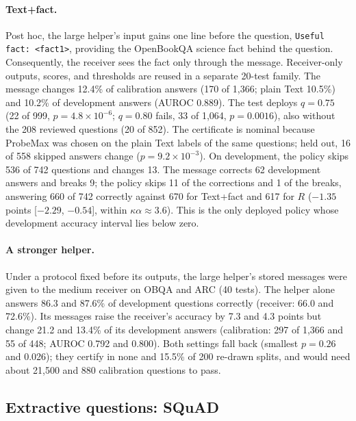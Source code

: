 \paragraph{Text+fact.} Post hoc, the large helper's input gains one line before the question, \texttt{Useful fact: <fact1>}, providing the OpenBookQA science fact behind the question. Consequently, the receiver sees the fact only through the message. Receiver-only outputs, scores, and thresholds are reused in a separate 20-test family. The message changes 12.4\% of calibration answers (170 of 1,366; plain Text 10.5\%) and 10.2\% of development answers (AUROC 0.889). The test deploys $q=0.75$ (22 of 999, $p=4.8\times10^{-6}$; $q=0.80$ fails, 33 of 1,064, $p=0.0016$), also without the 208 reviewed questions (20 of 852). The certificate is nominal because ProbeMax was chosen on the plain Text labels of the same questions; held out, 16 of 558 skipped answers change ($p=9.2\times10^{-3}$). On development, the policy skips 536 of 742 questions and changes 13. The message corrects 62 development answers and breaks 9; the policy skips 11 of the corrections and 1 of the breaks, answering 660 of 742 correctly against 670 for Text+fact and 617 for $R$ ($-1.35$ points [$-2.29$, $-0.54$], within $\kappa\alpha\approx3.6$). This is the only deployed policy whose development accuracy interval lies below zero.

\paragraph{A stronger helper.} Under a protocol fixed before its outputs, the large helper's stored messages were given to the medium receiver on OBQA and ARC (40 tests). The helper alone answers 86.3 and 87.6\% of development questions correctly (receiver: 66.0 and 72.6\%). Its messages raise the receiver's accuracy by 7.3 and 4.3 points but change 21.2 and 13.4\% of its development answers (calibration: 297 of 1,366 and 55 of 448; AUROC 0.792 and 0.800). Both settings fall back (smallest $p=0.26$ and 0.026); they certify in none and 15.5\% of 200 re-drawn splits, and would need about 21,500 and 880 calibration questions to pass.

\subsection{Extractive questions: SQuAD}\label{app:squad}

